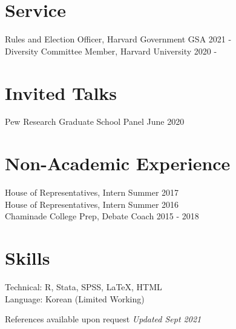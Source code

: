 \documentclass[margin, line]{res}
\begin{document}
\begin{resume}
\section{Service}
Rules and Election Officer, Harvard Government GSA \hfill 2021 -\\
Diversity Committee Member, Harvard University \hfill 2020 -

\section{Invited Talks}
Pew Research Graduate School Panel \hfill June 2020

\section{Non-Academic Experience}
House of Representatives, Intern \hfill Summer 2017\\
House of Representatives, Intern \hfill Summer 2016\\
Chaminade College Prep, Debate Coach \hfill 2015 - 2018

\section{Skills}
Technical: R, Stata, SPSS, \LaTeX, HTML\\
Language: Korean (Limited Working)

\small{References available upon request} \hfill \small{\textit{Updated Sept 2021}}

\end{resume}
\end{document}
